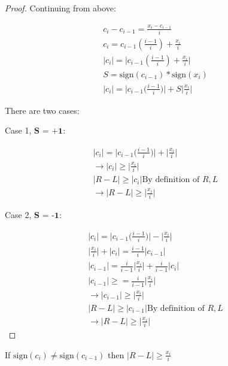 \begin{proof}
Continuing from above:

\begin{eqnarray*}
c_i - c_{i-1} = \frac{x_i - c_{i - 1} }{ i } \\
c_i = c_{i-1}( \frac{i-1}{i}) + \frac{x_i }{ i } \\
\big|c_i\big| = \big|c_{i-1} (\frac{i-1}{i}) + \frac{x_i }{ i }\big| \\
S = \textrm{sign}(c_{i-1} )*\textrm{sign}(x_i) \\
\big|c_i\big| = \big|c_{i-1} \big( \frac{i-1}{i} \big)\big| + S\big|\frac{x_i}{ i }\big|
\end{eqnarray*}

There are two cases:

Case 1, $\textbf{S = +1}$: 

\begin{eqnarray*}
\big|c_i\big| = \big|c_{i-1} \big( \frac{i-1}{i} \big) \big| + \big|\frac{x_i}{i}\big| \\
\rightarrow \big|c_i\big| \geq \big|\frac{x_i}{i}\big| \\ 
\big|R-L\big| \geq \big|c_i\big| \textrm{By definition of } R,L \\
\rightarrow \big|R-L\big| \geq \big|\frac{x_i}{i}\big|
\end{eqnarray*}

Case 2, $\textbf{S = -1}$: 

\begin{eqnarray*}
\big|c_i\big| = \big|c_{i-1} \big( \frac{i-1}{i} \big)\big| - \big|\frac{x_i}{i}\big| \\
\big|\frac{x_i}{i}\big| + \big|c_i\big| = \frac{i-1}{i}\big|c_{i-1}\big|  \\
\big|c_{i-1}\big| = \frac{i}{i-1}\big|\frac{x_i}{i}\big| + \frac{i}{i-1}\big|c_i\big| \\
\big|c_{i-1}\big| \geq = \frac{i}{i-1}\big|\frac{x_i}{i}\big| \\
\rightarrow \big|c_{i-1}\big| \geq \big|\frac{x_i}{i}\big| \\
\big|R-L\big| \geq \big|c_{i-1}\big| \textrm{By definition of } R,L \\ 
\rightarrow \big|R-L\big| \geq \big|\frac{x_i}{i}\big|
\end{eqnarray*}
\end{proof}

\begin{lem} \label{lem:diffSignNaive}
If $\textrm{sign}(c_i) \neq \textrm{sign}(c_{i-1})$ then $\big|R - L\big| \geq \frac{x_i}{i}$
\end{lem}

